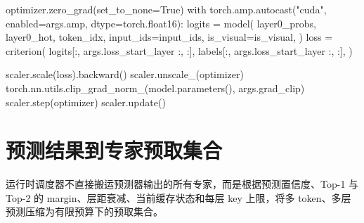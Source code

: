 \begin{CodeBlock}
        optimizer.zero_grad(set_to_none=True)
        with torch.amp.autocast("cuda", enabled=args.amp, dtype=torch.float16):
            logits = model(
                layer0_probs,
                layer0_hot,
                token_idx,
                input_ids=input_ids,
                is_visual=is_visual,
            )
            loss = criterion(
                logits[:, args.loss_start_layer :, :],
                labels[:, args.loss_start_layer :, :],
            )

        scaler.scale(loss).backward()
        scaler.unscale_(optimizer)
        torch.nn.utils.clip_grad_norm_(model.parameters(), args.grad_clip)
        scaler.step(optimizer)
        scaler.update()
\end{CodeBlock}

\section{预测结果到专家预取集合}
运行时调度器不直接搬运预测器输出的所有专家，而是根据预测置信度、Top-1 与 Top-2 的 margin、层距衰减、当前缓存状态和每层 key 上限，将多 token、多层预测压缩为有限预算下的预取集合。
